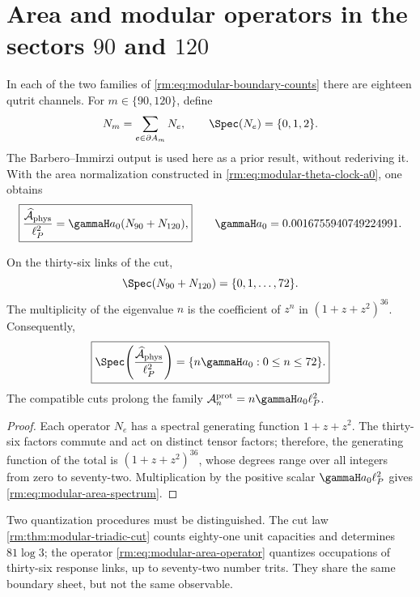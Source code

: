 \section{Area and modular operators in the sectors \texorpdfstring{\(90\)}{90} and \texorpdfstring{\(120\)}{120}}

In each of the two families of
\cref{rm:eq:modular-boundary-counts} there are eighteen qutrit channels. For
\(m\in\{90,120\}\), define
\begin{equation}
\label{rm:eq:modular-number-operators}
N_m=\sum_{e\in\partial A_m}N_e,
\qquad \Spec(N_e)=\{0,1,2\}.
\end{equation}
The Barbero--Immirzi output is used here as a prior result, without
rederiving it. With the area normalization constructed in
\cref{rm:eq:modular-theta-clock-a0}, one obtains
\begin{equation}
\label{rm:eq:modular-area-operator}
\boxed{
\frac{\widehat{\mathcal A}_{\rm phys}}{\ell_P^2}
=\gammaH a_0(N_{90}+N_{120}),}
\qquad
\gammaH a_0=0.0016755940749224991.
\end{equation}

\begin{theorem}
\label{rm:thm:modular-area-spectrum}
On the thirty-six links of the cut,
\begin{equation}
\label{rm:eq:modular-total-number-spectrum}
\Spec(N_{90}+N_{120})=\{0,1,\ldots,72\}.
\end{equation}
The multiplicity of the eigenvalue \(n\) is the coefficient of \(z^n\) in
\((1+z+z^2)^{36}\). Consequently,
\begin{equation}
\label{rm:eq:modular-area-spectrum}
\boxed{
\Spec\!\left(\frac{\widehat{\mathcal A}_{\rm phys}}{\ell_P^2}\right)
=\{n\gammaH a_0:0\leq n\leq72\}.}
\end{equation}
The compatible cuts prolong the family
\(\mathcal A_n^{\rm prot}=n\gammaH a_0\ell_P^2\).
\end{theorem}

\begin{proof}
Each operator \(N_e\) has a spectral generating function
\(1+z+z^2\). The thirty-six factors commute and act on distinct
tensor factors; therefore, the generating function of the total is
\((1+z+z^2)^{36}\), whose degrees range over all integers from zero to
seventy-two. Multiplication by the positive scalar
\(\gammaH a_0\ell_P^2\) gives \cref{rm:eq:modular-area-spectrum}.
\end{proof}

Two quantization procedures must be distinguished. The cut law \cref{rm:thm:modular-triadic-cut} counts eighty-one unit capacities and determines \(81\log3\); the operator \cref{rm:eq:modular-area-operator} quantizes occupations of thirty-six response links, up to seventy-two number trits. They share the same boundary sheet, but not the same observable.


